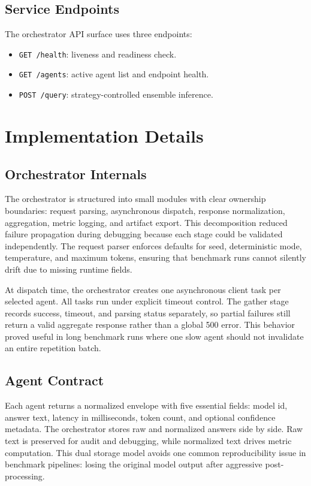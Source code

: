 \documentclass[conference]{IEEEtran}
\begin{document}
\subsection{Service Endpoints}
The orchestrator API surface uses three endpoints:
\begin{itemize}
  \item \texttt{GET /health}: liveness and readiness check.
  \item \texttt{GET /agents}: active agent list and endpoint health.
  \item \texttt{POST /query}: strategy-controlled ensemble inference.
\end{itemize}

\section{Implementation Details}
\subsection{Orchestrator Internals}
The orchestrator is structured into small modules with clear ownership boundaries: request parsing, asynchronous dispatch, response normalization, aggregation, metric logging, and artifact export. This decomposition reduced failure propagation during debugging because each stage could be validated independently. The request parser enforces defaults for seed, deterministic mode, temperature, and maximum tokens, ensuring that benchmark runs cannot silently drift due to missing runtime fields.

At dispatch time, the orchestrator creates one asynchronous client task per selected agent. All tasks run under explicit timeout control. The gather stage records success, timeout, and parsing status separately, so partial failures still return a valid aggregate response rather than a global 500 error. This behavior proved useful in long benchmark runs where one slow agent should not invalidate an entire repetition batch.

\subsection{Agent Contract}
Each agent returns a normalized envelope with five essential fields: model id, answer text, latency in milliseconds, token count, and optional confidence metadata. The orchestrator stores raw and normalized answers side by side. Raw text is preserved for audit and debugging, while normalized text drives metric computation. This dual storage model avoids one common reproducibility issue in benchmark pipelines: losing the original model output after aggressive post-processing.
\end{document}
